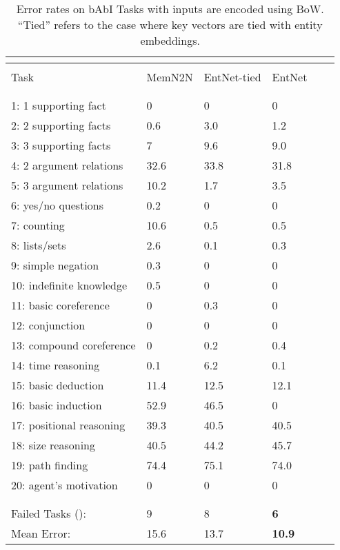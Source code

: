 \documentclass{article} \usepackage{iclr2016_conference,times}
\newcommand{\modelabbrev}{EntNet}
\begin{document}
\begin{table}[htp!]
\caption{Error rates on bAbI Tasks with inputs are encoded using BoW. ``Tied'' refers to the case where key vectors are tied with entity embeddings.}
\label{bow-babi}
\begin{center}
\begin{tabular}{llllll}
\multicolumn{1}{c}{\bf }  &\multicolumn{2}{c}{}
\\ \hline \\
Task & MemN2N & \modelabbrev-tied & \modelabbrev\\
\\ \hline \\
1: 1 supporting fact         & 0 & 0 & 0\\
2: 2 supporting facts        & 0.6 & 3.0 & 1.2\\ 
3: 3 supporting facts        & 7 & 9.6 & 9.0 \\
4: 2 argument relations      & 32.6 & 33.8 & 31.8 \\
5: 3 argument relations      & 10.2 & 1.7 & 3.5\\
6: yes/no questions          & 0.2 & 0 & 0 \\
7: counting & 10.6 & 0.5 & 0.5\\
8: lists/sets & 2.6 & 0.1 & 0.3\\
9: simple negation & 0.3 & 0 & 0 \\
10: indefinite knowledge & 0.5 & 0 & 0 \\
11: basic coreference & 0 & 0.3 & 0\\
12: conjunction & 0 & 0 & 0\\
13: compound coreference & 0 & 0.2 & 0.4 \\
14: time reasoning & 0.1 & 6.2 & 0.1 \\
15: basic deduction & 11.4 & 12.5 & 12.1 \\
16: basic induction & 52.9 & 46.5 & 0\\
17: positional reasoning & 39.3 & 40.5 & 40.5 \\
18: size reasoning & 40.5 & 44.2 & 45.7 \\
19: path finding & 74.4 & 75.1 & 74.0\\
20: agent's motivation & 0 & 0 & 0\\
\\ \hline \\
Failed Tasks (): & 9 & 8 & \textbf{6}\\
Mean Error: & 15.6 & 13.7 & \textbf{10.9}\\
\end{tabular}
\end{center}
\end{table}
\end{document}
